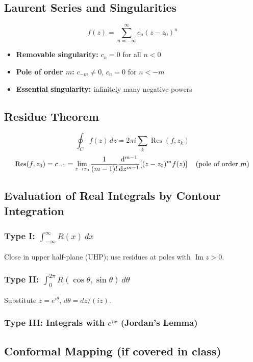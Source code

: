 \documentclass[11pt, letterpaper]{article}
\theoremstyle{plain}
\renewcommand{\Im}{\operatorname{Im}}
\renewcommand{\Res}{\operatorname{Res}}
\begin{document}
\subsection{Laurent Series and Singularities}
\[
  f(z) = \sum_{n=-\infty}^{\infty} c_n (z-z_0)^n
\]
\begin{itemize}
  \item \textbf{Removable singularity:} $c_n = 0$ for all $n < 0$
  \item \textbf{Pole of order $m$:} $c_{-m}\neq 0$, $c_n=0$ for $n<-m$
  \item \textbf{Essential singularity:} infinitely many negative powers
\end{itemize}

\subsection{Residue Theorem}
\[
  \oint_C f(z)\,dz = 2\pi i \sum_k \Res(f, z_k)
\]
\[
  \Res(f, z_0) = c_{-1} = \lim_{z\to z_0} \frac{1}{(m-1)!}
  \dv[m-1]{}{z}\!\left[(z-z_0)^m f(z)\right]
  \quad \text{(pole of order }m\text{)}
\]

\subsection{Evaluation of Real Integrals by Contour Integration}

\subsubsection*{Type I: $\int_{-\infty}^{\infty} R(x)\,dx$}
Close in upper half-plane (UHP); use residues at poles with $\Im z > 0$.

\subsubsection*{Type II: $\int_0^{2\pi} R(\cos\theta,\sin\theta)\,d\theta$}
Substitute $z = e^{i\theta}$, $d\theta = dz/(iz)$.

\subsubsection*{Type III: Integrals with $e^{ix}$ (Jordan's Lemma)}

\subsection{Conformal Mapping (if covered in class)}
\end{document}
